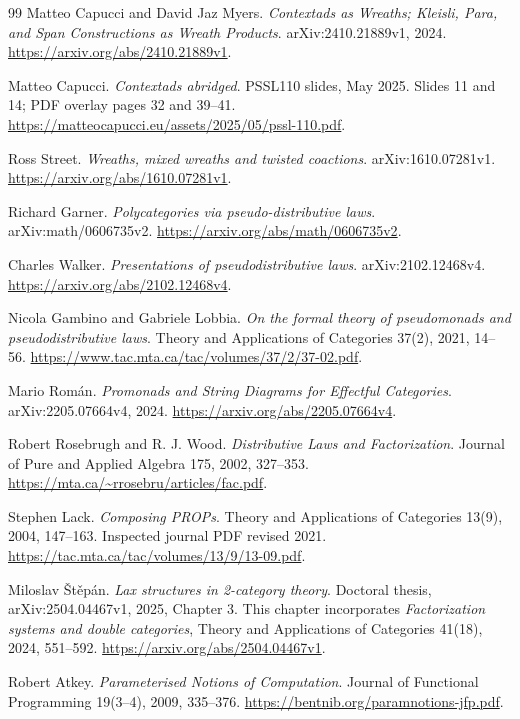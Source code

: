 \documentclass[11pt,letterpaper]{article}
\begin{document}
\begin{thebibliography}{99}
 Matteo Capucci and David Jaz Myers.
\emph{Contextads as Wreaths; Kleisli, Para, and Span Constructions as Wreath Products}.
arXiv:2410.21889v1, 2024.
\url{https://arxiv.org/abs/2410.21889v1}.

 Matteo Capucci.
\emph{Contextads abridged}. PSSL110 slides, May 2025.
Slides 11 and 14; PDF overlay pages 32 and 39--41.
\url{https://matteocapucci.eu/assets/2025/05/pssl-110.pdf}.

 Ross Street.
\emph{Wreaths, mixed wreaths and twisted coactions}.
arXiv:1610.07281v1.
\url{https://arxiv.org/abs/1610.07281v1}.

 Richard Garner.
\emph{Polycategories via pseudo-distributive laws}.
arXiv:math/0606735v2.
\url{https://arxiv.org/abs/math/0606735v2}.

 Charles Walker.
\emph{Presentations of pseudodistributive laws}.
arXiv:2102.12468v4.
\url{https://arxiv.org/abs/2102.12468v4}.

 Nicola Gambino and Gabriele Lobbia.
\emph{On the formal theory of pseudomonads and pseudodistributive laws}.
Theory and Applications of Categories 37(2), 2021, 14--56.
\url{https://www.tac.mta.ca/tac/volumes/37/2/37-02.pdf}.

 Mario Rom\'an.
\emph{Promonads and String Diagrams for Effectful Categories}.
arXiv:2205.07664v4, 2024.
\url{https://arxiv.org/abs/2205.07664v4}.

 Robert Rosebrugh and R. J. Wood.
\emph{Distributive Laws and Factorization}.
Journal of Pure and Applied Algebra 175, 2002, 327--353.
\url{https://mta.ca/~rrosebru/articles/fac.pdf}.

 Stephen Lack.
\emph{Composing PROPs}.
Theory and Applications of Categories 13(9), 2004, 147--163.
Inspected journal PDF revised 2021.
\url{https://tac.mta.ca/tac/volumes/13/9/13-09.pdf}.

 Miloslav \v{S}t\v{e}p\'an.
\emph{Lax structures in 2-category theory}.
Doctoral thesis, arXiv:2504.04467v1, 2025, Chapter 3.
This chapter incorporates \emph{Factorization systems and double categories},
Theory and Applications of Categories 41(18), 2024, 551--592.
\url{https://arxiv.org/abs/2504.04467v1}.

 Robert Atkey.
\emph{Parameterised Notions of Computation}.
Journal of Functional Programming 19(3--4), 2009, 335--376.
\url{https://bentnib.org/paramnotions-jfp.pdf}.


\end{thebibliography}
\end{document}
